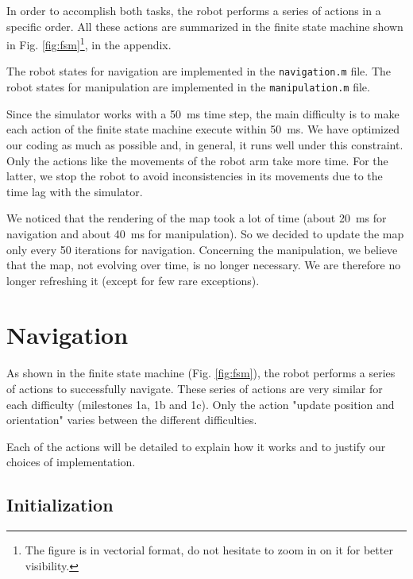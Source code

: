 \documentclass[a4paper, 10pt, conference]{ieeeconf}
\begin{document}
    In order to accomplish both tasks, the robot performs a series of actions in a specific order. All these actions are summarized in the finite state machine shown in Fig. \ref{fig:fsm}\footnote{The figure is in vectorial format, do not hesitate to zoom in on it for better visibility.}, in the appendix.
    
    The robot states for navigation are implemented in the \texttt{navigation.m} file. The robot states for manipulation are implemented in the \texttt{manipulation.m} file.
    
    Since the simulator works with a \SI{50}{\milli\second} time step, the main difficulty is to make each action of the finite state machine execute within \SI{50}{\milli\second}. We have optimized our coding as much as possible and, in general, it runs well under this constraint. Only the actions like the movements of the robot arm take more time. For the latter, we stop the robot to avoid inconsistencies in its movements due to the time lag with the simulator.
    
    We noticed that the rendering of the map took a lot of time (about \SI{20}{\milli\second} for navigation and about \SI{40}{\milli\second} for manipulation). So we decided to update the map only every \num{50} iterations for navigation. Concerning the manipulation, we believe that the map, not evolving over time, is no longer necessary. We are therefore no longer refreshing it (except for few rare exceptions).
    
    
    \section{Navigation}\label{sec:navigation}
    
    As shown in the finite state machine (Fig. \ref{fig:fsm}), the robot performs a series of actions to successfully navigate. These series of actions are very similar for each difficulty (milestones 1a, 1b and 1c). Only the action "update position and orientation" varies between the different difficulties.
    
    Each of the actions will be detailed to explain how it works and to justify our choices of implementation.
    
    \subsection{Initialization}
    
\end{document}
